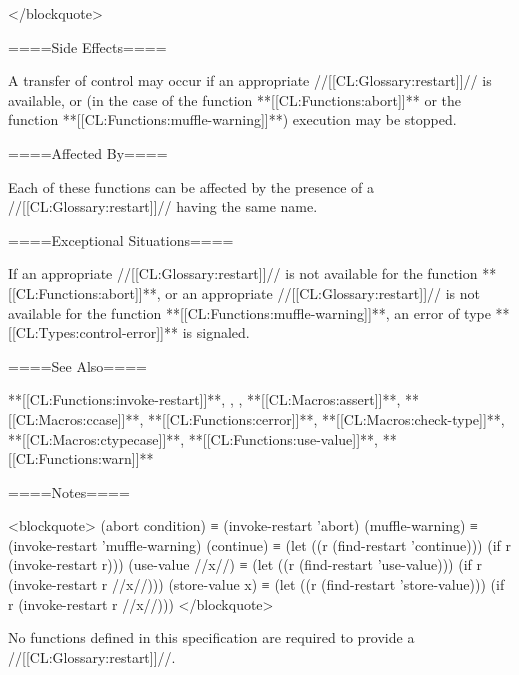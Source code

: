 </blockquote>

====Side Effects====

A transfer of control may occur if an appropriate //[[CL:Glossary:restart]]// is available, or (in the case of the function **[[CL:Functions:abort]]** or the function **[[CL:Functions:muffle-warning]]**) execution may be stopped.

====Affected By====

Each of these functions can be affected by the presence of a //[[CL:Glossary:restart]]// having the same name.

====Exceptional Situations====

If an appropriate  //[[CL:Glossary:restart]]// is not available for the function **[[CL:Functions:abort]]**, or an appropriate  //[[CL:Glossary:restart]]// is not available for the function **[[CL:Functions:muffle-warning]]**, an error of type **[[CL:Types:control-error]]** is signaled.

====See Also====

**[[CL:Functions:invoke-restart]]**, {\secref\Restarts}, {\secref\InterfacesToRestarts}, **[[CL:Macros:assert]]**, **[[CL:Macros:ccase]]**, **[[CL:Functions:cerror]]**, **[[CL:Macros:check-type]]**, **[[CL:Macros:ctypecase]]**, **[[CL:Functions:use-value]]**, **[[CL:Functions:warn]]**

====Notes====

<blockquote> (abort condition) ≡ (invoke-restart 'abort) (muffle-warning) ≡ (invoke-restart 'muffle-warning) (continue) ≡ (let ((r (find-restart 'continue))) (if r (invoke-restart r))) (use-value //x//) ≡ (let ((r (find-restart 'use-value))) (if r (invoke-restart r //x//))) (store-value x) ≡ (let ((r (find-restart 'store-value))) (if r (invoke-restart r //x//))) </blockquote>

No functions defined in this specification are required to provide a  //[[CL:Glossary:restart]]//.

   
